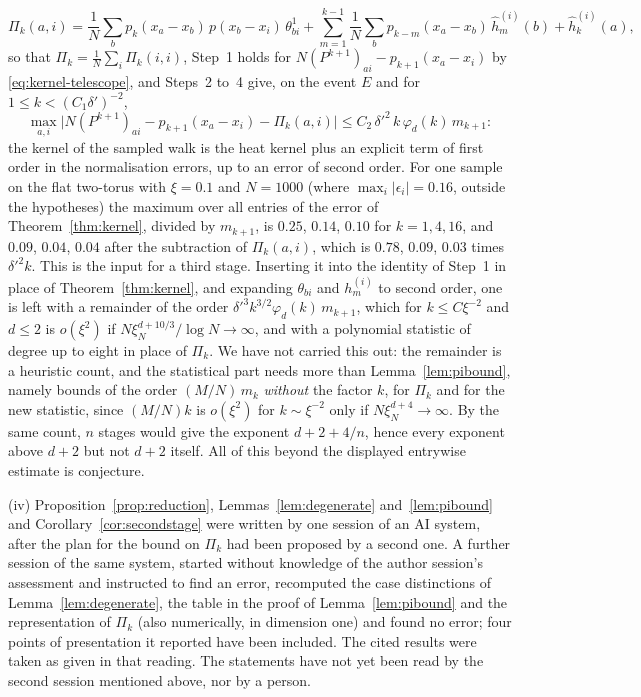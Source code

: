 \begin{remark}
\[
\Pi_k(a,i)=\frac1N\sum_bp_k(x_a-x_b)\,p(x_b-x_i)\,\theta^1_{bi}+\sum_{m=1}^{k-1}\frac1N\sum_bp_{k-m}(x_a-x_b)\,\hat h^{(i)}_m(b)+\hat h^{(i)}_k(a),
\]
so that $\Pi_k=\frac1N\sum_i\Pi_k(i,i)$, Step~1 holds for $N(P^{k+1})_{ai}-p_{k+1}(x_a-x_i)$ by \eqref{eq:kernel-telescope}, and Steps~2 to~4 give, on the event $E$ and for $1\le k<(C_1\delta')^{-2}$,
\[
\max_{a,i}\big|N(P^{k+1})_{ai}-p_{k+1}(x_a-x_i)-\Pi_k(a,i)\big|\le C_2\,\delta'^2\,k\,\varphi_d(k)\,m_{k+1}:
\]
the kernel of the sampled walk is the heat kernel plus an explicit term of first order in the normalisation errors, up to an error of second order. For one sample on the flat two-torus with $\xi=0.1$ and $N=1000$ (where $\max_i|\epsilon_i|=0.16$, outside the hypotheses) the maximum over all entries of the error of Theorem~\ref{thm:kernel}, divided by $m_{k+1}$, is $0.25$, $0.14$, $0.10$ for $k=1,4,16$, and $0.09$, $0.04$, $0.04$ after the subtraction of $\Pi_k(a,i)$, which is $0.78$, $0.09$, $0.03$ times $\delta'^2k$. This is the input for a third stage. Inserting it into the identity of Step~1 in place of Theorem~\ref{thm:kernel}, and expanding $\theta_{bi}$ and $h^{(i)}_m$ to second order, one is left with a remainder of the order $\delta'^3k^{3/2}\varphi_d(k)\,m_{k+1}$, which for $k\le C\xi^{-2}$ and $d\le2$ is $o(\xi^2)$ if $N\xi_N^{d+10/3}/\log N\to\infty$, and with a polynomial statistic of degree up to eight in place of $\Pi_k$. We have not carried this out: the remainder is a heuristic count, and the statistical part needs more than Lemma~\ref{lem:pibound}, namely bounds of the order $(M/N)\,m_k$ \emph{without} the factor $k$, for $\Pi_k$ and for the new statistic, since $(M/N)k$ is $o(\xi^2)$ for $k\sim\xi^{-2}$ only if $N\xi_N^{d+4}\to\infty$. By the same count, $n$ stages would give the exponent $d+2+4/n$, hence every exponent above $d+2$ but not $d+2$ itself. All of this beyond the displayed entrywise estimate is conjecture.

(iv) Proposition~\ref{prop:reduction}, Lemmas~\ref{lem:degenerate} and~\ref{lem:pibound} and Corollary~\ref{cor:secondstage} were written by one session of an AI system, after the plan for the bound on $\Pi_k$ had been proposed by a second one. A further session of the same system, started without knowledge of the author session's assessment and instructed to find an error, recomputed the case distinctions of Lemma~\ref{lem:degenerate}, the table in the proof of Lemma~\ref{lem:pibound} and the representation of $\Pi_k$ (also numerically, in dimension one) and found no error; four points of presentation it reported have been included. The cited results were taken as given in that reading. The statements have not yet been read by the second session mentioned above, nor by a person.
\end{remark}


